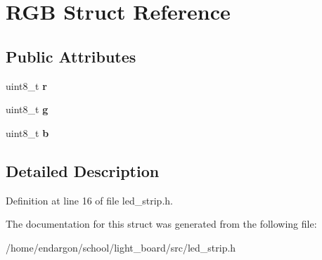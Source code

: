 \hypertarget{structRGB}{}\section{R\+GB Struct Reference}
\label{structRGB}
\subsection*{Public Attributes}
\begin{DoxyCompactItemize}
\item 
uint8\+\_\+t {\bfseries r}\hypertarget{structRGB_ac06dc5fdbe17be3b71a5ba8866f23fea}{}\label{structRGB_ac06dc5fdbe17be3b71a5ba8866f23fea}

\item 
uint8\+\_\+t {\bfseries g}\hypertarget{structRGB_af970a72243681add6fdab6f215568b05}{}\label{structRGB_af970a72243681add6fdab6f215568b05}

\item 
uint8\+\_\+t {\bfseries b}\hypertarget{structRGB_abe4c6992a197eff41d9b4dedfb251c87}{}\label{structRGB_abe4c6992a197eff41d9b4dedfb251c87}

\end{DoxyCompactItemize}


\subsection{Detailed Description}


Definition at line 16 of file led\+\_\+strip.\+h.



The documentation for this struct was generated from the following file\+:\begin{DoxyCompactItemize}
\item 
/home/endargon/school/light\+\_\+board/src/led\+\_\+strip.\+h\end{DoxyCompactItemize}
